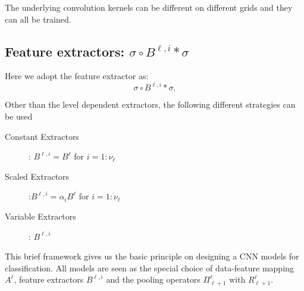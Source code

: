 The underlying convolution kernels can be different on different grids and they can
all be trained.


\subsection{Feature extractors: $\sigma \circ B^{\ell,i} \ast \sigma$}
Here we adopt the feature extractor as:
\begin{equation}
\label{extractor-ell}
\sigma\circ B^{\ell,i}\ast\sigma.
\end{equation}

Other than the level dependent extractors, the following 
different strategies can be used
\begin{description}
	\item[Constant Extractors]: $B^{\ell,i}=B^{\ell}$ for   $i=1:\nu_\ell$
	\item[Scaled Extractors]:$B^{\ell,i}=\alpha_iB^{\ell}$ for   $i=1:\nu_\ell$
	\item[Variable Extractors]: $B^{\ell,i}$
\end{description}



This brief framework gives us the basic principle on designing 
a CNN models for classification. All models are seen as the special
choice of data-feature mapping $A^\ell$, feature extractors $B^{\ell,i}$ 
and the pooling operators $\Pi_{\ell+1}^\ell$ with $R_{\ell+1}^\ell$.




\endinput
Similarly, we can consider about the back-slash cycle process:
\begin{breakablealgorithm}
	\caption{$u^J={\rm MgNet1}(f; J,\nu_1, \cdots, \nu_J; \nu'_1, \cdots, \nu'_J )$}
	\label{alg:mgnet1}
	\begin{algorithmic}
		\State 
		$$
		(\bar u^{1,0}, \bar u^1, f^1, \bar u^{2,0}, u^2, f^2,\cdots, \bar u^{J,0},\bar u^J, f^J) = \text{MgNet}(f; J,\nu_1, \cdots, \nu_J).
		$$
		\For{$\ell = J-1 : 1$}
		\begin{equation}
		u^{\ell,0} \leftarrow \bar u^{\ell} + R_{\ell}^{\ell+1} \ast_2^T (u^{\ell+1} - \bar u^{\ell+1,0}).
		\end{equation}
		\For{$i = 1:\nu'_\ell$}
		\State 
		\begin{equation}\label{mgnet}
		u^{\ell,i} \leftarrow u^{\ell,i-1} + (B^{\ell,i})'  ({f^\ell -  A^{\ell} \ast u^{\ell,i-1}}).
		\end{equation}
		\EndFor
		\State  
		$$
		u^{\ell} \leftarrow u^{\ell,\nu_\ell'} .
		$$
		\EndFor
		\State 
		$$
		(u^1,\cdots, u^{J-1}).
		$$
	\end{algorithmic}
\end{breakablealgorithm}

